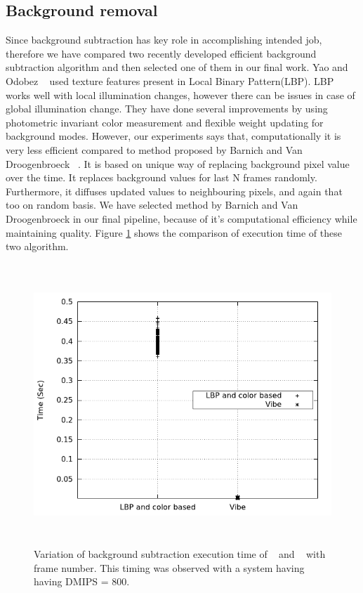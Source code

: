 \subsection{Background removal}

\indent Since background subtraction has key role in accomplishing
intended job, therefore we have compared two recently developed
efficient background subtraction algorithm and then selected one of them
in our final work.  Yao and Odobez ~\cite{11} used texture features
present in Local Binary Pattern(LBP). LBP works well with local
illumination changes, however there can be issues in case of global
illumination change. They have done several improvements by using
photometric invariant color measurement and flexible weight updating for
background modes. However, our experiments says that, computationally it
is very less efficient compared to method proposed by Barnich and Van
Droogenbroeck  ~\cite{9}.  It is based on unique way of replacing
background pixel value over the time. It replaces background values for
last N frames randomly.  Furthermore, it diffuses updated values to
neighbouring pixels, and again that too on random basis. We have
selected method by Barnich and Van Droogenbroeck  in our final pipeline,
because of it's computational efficiency while maintaining quality.
Figure \ref{bg_compare} shows the comparison of execution time of these
two algorithm.

\begin{figure}[!t]
\centering
\includegraphics[height=300pt]{Figures/bg_compare}
\caption{Variation of background subtraction execution time of ~\cite{11}
and ~\cite{9} with frame number. This timing was observed with a system
having having DMIPS = 800.}
\label{bg_compare}
\end{figure}

